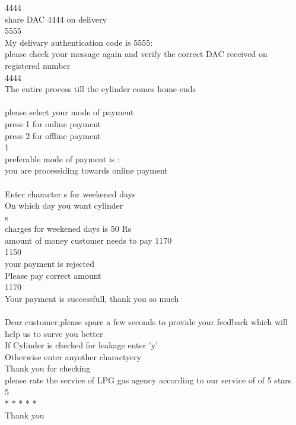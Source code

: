 \documentclass{article}
\begin{document}
{4444\\
share DAC 4444 on delivery\\
5555\\
My delivary authentication code is 5555:\\
please check your message again and verify the correct DAC received on\\ registered number\\
4444\\
The entire process till the cylinder comes home ends\\
\\
please select your mode of payment\\
press 1 for online payment\\
press 2 for offline payment\\
1\\
preferable mode of payment is :\\
you are processiding towards online payment\\
\\
Enter character s for weekened days\\
On which day you want cylinder\\
s\\
charges for weekened days is 50 Rs\\
amount of money customer needs to pay  1170\\
1150\\
your payment is rejected\\
Please pay correct amount\\
1170\\
Your payment is successfull, thank you so much\\
\\
Dear customer,please spare a few seconds to provide your feedback which will help us to surve you better\\
  If Cylinder is checked for leakage enter 'y'\\
Otherwise enter anyother charactyery\\
Thank you for checking\\
please rate the service of LPG gas agency according to our service of of 5 stars\\
5\\
* * * * *\\
Thank you\\
\\
\\
\\
\\
}
\end{document}
